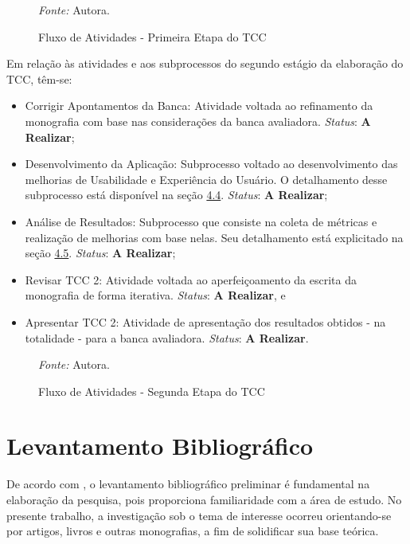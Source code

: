 \pagebreak

\begin{figure}[h!]
	\centering
	\caption{Fluxo de Atividades - Primeira Etapa do TCC}
	\begin{tablenotes}[flushleft]
		\centering
		\item \textit{Fonte:} Autora.
	  \end{tablenotes}
	\label{fig04}
\end{figure}
Em relação às atividades e aos subprocessos do segundo estágio da elaboração do TCC, têm-se:

\begin{itemize}
	\item Corrigir Apontamentos da Banca: Atividade voltada ao refinamento da monografia com base nas considerações da banca avaliadora. \textit{Status}: \textbf{A Realizar};
	\item Desenvolvimento da Aplicação: Subprocesso voltado ao desenvolvimento das melhorias de Usabilidade e Experiência do Usuário. O detalhamento desse subprocesso está disponível na seção \hyperref[sec:Metodologia de Desenvolvimento]{4.4}. \textit{Status}: \textbf{A Realizar};
	\item Análise de Resultados: Subprocesso que consiste na coleta de métricas e realização de melhorias com base nelas. Seu detalhamento está explicitado na seção \hyperref[sec:Metodologia de Analise de Resultados]{4.5}. \textit{Status}: \textbf{A Realizar};
	\item Revisar TCC 2: Atividade voltada ao aperfeiçoamento da escrita da monografia de forma iterativa. \textit{Status}: \textbf{A Realizar}, e
	\item Apresentar TCC 2: Atividade de apresentação dos resultados obtidos - na totalidade - para a banca avaliadora. \textit{Status}: \textbf{A Realizar}.
\end{itemize}


\begin{figure}[h!]
	\centering
	\caption{Fluxo de Atividades - Segunda Etapa do TCC}
	\begin{tablenotes}[flushleft]
		\centering
		\item \textit{Fonte:} Autora.
	  \end{tablenotes}
	\label{fig05}
\end{figure}

\section{Levantamento Bibliográfico}
\label{sec:Levantamento Bibliografico}
De acordo com , o levantamento bibliográfico preliminar é fundamental na elaboração da pesquisa, pois proporciona familiaridade com a área de estudo. No presente trabalho, a investigação sob o tema de interesse ocorreu orientando-se por artigos, livros e outras monografias, a fim de solidificar sua base teórica.

